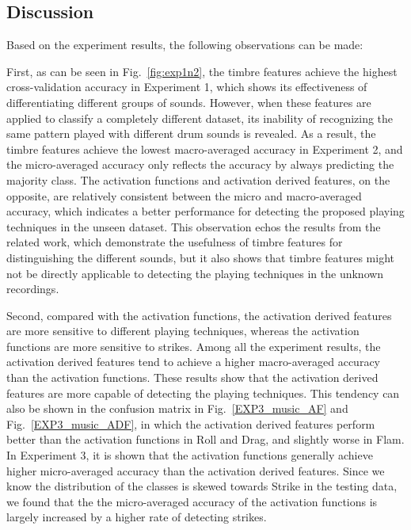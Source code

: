 \documentclass{article}
\begin{document}
{{{{{{{{{%

\subsection{Discussion}
\label{ssec:discussion}
Based on the experiment results, the following observations can be made: 

First,  as can be seen in Fig.~\ref{fig:exp1n2}, the timbre features achieve the highest cross-validation accuracy in Experiment 1, which shows its effectiveness of differentiating different groups of sounds. However, when these features are applied to classify a completely different dataset, its inability of recognizing the same pattern played with different drum sounds is revealed. As a result, the timbre features achieve the lowest macro-averaged accuracy in Experiment 2, and the micro-averaged accuracy only reflects the accuracy by always predicting the majority class. The activation functions and activation derived features, on the opposite, are relatively consistent between the micro and macro-averaged accuracy, which indicates a better performance for detecting the proposed playing techniques in the unseen dataset. This observation echos the results from the related work, which demonstrate the usefulness of timbre features for distinguishing the different sounds, but it also shows that timbre features might not be directly applicable to detecting the playing techniques in the unknown recordings. 

Second, compared with the activation functions, the activation derived features are more sensitive to different playing techniques, whereas the activation functions are more sensitive to strikes. Among all the experiment results, the activation derived features tend to achieve a higher macro-averaged accuracy than the activation functions. These results show that the activation derived features are more capable of detecting the playing techniques. This tendency can also be shown in the confusion matrix in Fig.~\ref{EXP3_music_AF} and Fig.~\ref{EXP3_music_ADF}, in which the activation derived features perform better than the activation functions in Roll and Drag, and slightly worse in Flam. In Experiment 3, it is shown that the activation functions generally achieve higher micro-averaged accuracy than the activation derived features. Since we know the distribution of the classes is skewed towards Strike in the testing data, we found that the the micro-averaged accuracy of the activation functions is largely increased by a higher rate of detecting strikes.

}}}}}}}}}
\end{document}
